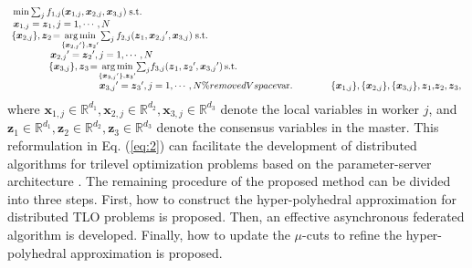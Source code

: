 \documentclass[letterpaper]{article} %
\begin{document}
\begin{equation}
\label{eq:2}
\begin{array}{l}
\min \sum\nolimits_{j} {{f_{1,j}}({\boldsymbol{x}_{1,j}},{\boldsymbol{x}_{2,j}},{\boldsymbol{x}_{3,j}})} \;{\rm{s}}.{\rm{t}}. \\

 {\boldsymbol{x}_{1,j}} = {\boldsymbol{z}_1},j = 1, \cdots ,N \\

\! \{{\boldsymbol{x}_{2,j}}\} ,{\boldsymbol{z}_2} \!=\! \mathop {\arg \min }\limits_{\{ {\boldsymbol{x}_{2,j}}'\} ,{\boldsymbol{z}_2}'} \sum\nolimits_{j} {{f_{2,j}}({\boldsymbol{z}_1},{\boldsymbol{x}_{2,j}}',{\boldsymbol{x}_{3,j}})} \;{\rm{s}}.{\rm{t}}. \\

 \qquad \quad \;\;\, \,  {\boldsymbol{x}_{2,j}}' = {\boldsymbol{z}_2}',j = 1, \cdots ,N \\

 \qquad \quad \;\;\,   \{{\boldsymbol{x}_{3,j}}\} ,{\boldsymbol{z}_3} \!=\! \mathop {\arg \min }\limits_{\{{\boldsymbol{x}_{3,j}}'\},{\boldsymbol{z}_3}'} \! \sum\nolimits_{j} \!{{f_{3,j}}({\boldsymbol{z}_1},{\boldsymbol{z}_2}',{\boldsymbol{x}_{3,j}}')} \,{\rm{s}}.{\rm{t}}. \\

 \qquad \qquad \qquad \qquad \quad   {\boldsymbol{x}_{3,j}}' = {\boldsymbol{z}_3}',j = 1, \cdots ,N \%removedVspace

{\mathop{\rm var}}. \qquad  \qquad \{{\boldsymbol{x}_{1,j}}\} ,{\rm{\{ }}{\boldsymbol{x}_{2,j}}\} ,{\rm{\{ }}{\boldsymbol{x}_{3,j}}\} ,{\boldsymbol{z}_1}{\rm{,}}{\boldsymbol{z}_2},{\boldsymbol{z}_3},
\end{array}
\end{equation}
where $\boldsymbol{x}_{1,j} \!\in\! \mathbb{R}^{d_1}, \boldsymbol{x}_{2,j}\!\in\! \mathbb{R}^{d_2}, \boldsymbol{x}_{3,j}\!\in\! \mathbb{R}^{d_3}$ denote the local variables in worker $j$, and $\boldsymbol{z}_1 \!\in\! \mathbb{R}^{d_1}, \boldsymbol{z}_2\!\in\! \mathbb{R}^{d_2}, \boldsymbol{z}_3\!\in\! \mathbb{R}^{d_3}$ denote the consensus variables in the master. This reformulation in Eq. (\ref{eq:2}) can facilitate the development of distributed algorithms for trilevel optimization problems based on the parameter-server architecture \cite{assran2020advances}. The remaining procedure of the proposed method can be divided into three steps. First, how to construct the hyper-polyhedral approximation for distributed TLO problems is proposed. Then, an effective asynchronous federated algorithm is developed. Finally, how to update the $\mu$-cuts to refine the hyper-polyhedral approximation is proposed.
\end{document}
